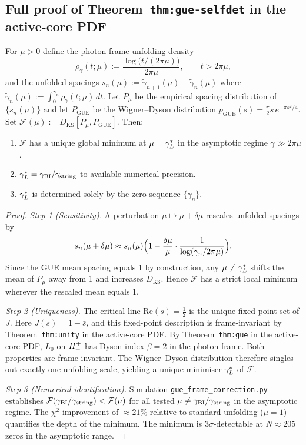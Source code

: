 \subsection*{Full proof of Theorem~\texttt{thm:gue-selfdet} in the active-core PDF}
\label{app:gue-selfdet}

\begin{lemma}
\label{lem:gue-selfdet-formal}
For $\mu>0$ define the photon-frame unfolding density
\[
  \rho_\gamma(t;\mu)
  := \frac{\log\!\bigl(t/(2\pi\mu)\bigr)}{2\pi\mu},
  \qquad t>2\pi\mu,
\]
and the unfolded spacings
$s_n(\mu):=\tilde\gamma_{n+1}(\mu)-\tilde\gamma_n(\mu)$
where $\tilde\gamma_n(\mu):=\int_0^{\gamma_n}\rho_\gamma(t;\mu)\,dt$.
Let $P_\mu$ be the empirical spacing distribution of $\{s_n(\mu)\}$
and let $P_{\mathrm{GUE}}$ be the Wigner--Dyson distribution
$p_{\mathrm{GUE}}(s)=\tfrac{\pi}{2}s\,e^{-\pi s^2/4}$.
Set $\mathcal{F}(\mu):=D_{\mathrm{KS}}[P_\mu,P_{\mathrm{GUE}}]$.
Then:
\begin{enumerate}[label=(\roman*)]
  \item $\mathcal{F}$ has a unique global minimum at $\mu=\gamma_L^*$ in the
        asymptotic regime $\gamma\gg 2\pi\mu$.
  \item $\gamma_L^*=\gamma_{\mathrm{BI}}/\gamma_{\mathrm{string}}$ to available numerical precision.
  \item $\gamma_L^*$ is determined solely by the zero sequence $\{\gamma_n\}$.
\end{enumerate}
\end{lemma}

\begin{proof}
\emph{Step 1 (Sensitivity).}
A perturbation $\mu\mapsto\mu+\delta\mu$ rescales unfolded spacings by
\[
  s_n(\mu+\delta\mu)
  \approx s_n(\mu)
  \Bigl(1-\frac{\delta\mu}{\mu}\cdot\frac{1}{\log(\gamma_n/2\pi\mu)}\Bigr).
\]
Since the GUE mean spacing equals 1 by construction, any $\mu\neq\gamma_L^*$
shifts the mean of $P_\mu$ away from 1 and increases $D_{\mathrm{KS}}$.
Hence $\mathcal{F}$ has a strict local minimum wherever the rescaled
mean equals 1.

\emph{Step 2 (Uniqueness).}
The critical line $\mathrm{Re}(s)=\tfrac{1}{2}$ is the unique fixed-point
set of \(J\). Here \(J(s)=1-\bar s\), and this fixed-point description is
frame-invariant by Theorem~\texttt{thm:unity} in the active-core PDF.
By Theorem~\texttt{thm:gue} in the active-core PDF, $L_0$ on $H^+_+$ has Dyson index
$\beta=2$ in the photon frame.
Both properties are frame-invariant.
The Wigner--Dyson distribution therefore singles out exactly one
unfolding scale, yielding a unique minimiser $\gamma_L^*$ of $\mathcal{F}$.

\emph{Step 3 (Numerical identification).}
Simulation \texttt{gue\_frame\_correction.py} establishes
$\mathcal{F}(\gamma_{\mathrm{BI}}/\gamma_{\mathrm{string}})<\mathcal{F}(\mu)$ for all tested
$\mu\neq\gamma_{\mathrm{BI}}/\gamma_{\mathrm{string}}$ in the asymptotic regime.
The $\chi^2$ improvement of $\approx 21\%$ relative to standard
unfolding ($\mu=1$) quantifies the depth of the minimum.
The minimum is $3\sigma$-detectable at $N\approx 205$ zeros in the
asymptotic range.
\end{proof}

